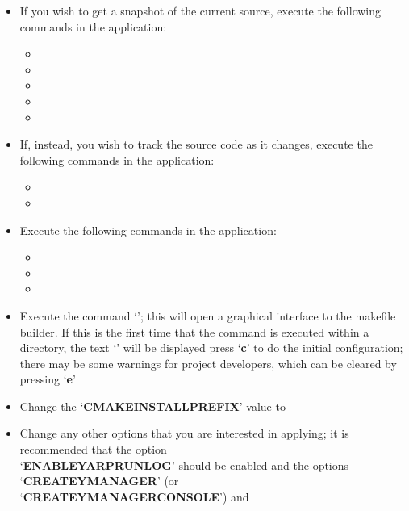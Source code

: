 \begin{itemize}
\item If you wish to get a snapshot of the current source, execute the following
commands in the  application:
\begin{itemize}
\item {}
\item\exSp{}
\item\exSp{}
\item\exSp{}
\item\exSp{}
\end{itemize}
\item\exSp{}If, instead, you wish to track the source code as it changes, execute the
following commands in the  application:
\begin{itemize}
\item {}
\item\exSp{}
\end{itemize}
\item\exSp{}Execute the following commands in the  application:
\begin{itemize}
\item {}
\item\exSp{}
\item\exSp{}
\end{itemize}
\item\exSp{}Execute the command `'; this will open a graphical
interface to the makefile builder. If this is the first time that the command is executed
within a directory, the text `' will be displayed \longDash{} press
`\textbf{c}' to do the initial configuration; there may be some warnings for project
developers, which can be cleared by pressing `\textbf{e}'
\item\exSp{}Change the `\textbf{CMAKE\fUS{}INSTALL\fUS{}PREFIX}' value to
\item\exSp{}Change any other options that you are interested in applying; it is
recommended that the option\\
`\textbf{ENABLE\fUS{}YARPRUN\fUS{}LOG}' should be enabled and the options
`\textbf{CREATE\fUS{}YMANAGER}' (or\\
`\textbf{CREATE\fUS{}YMANAGER\fUS{}CONSOLE}') and

\end{itemize}
